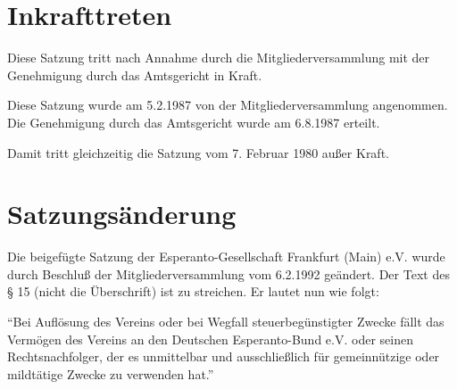 \documentclass[11pt]{article}
\begin{document}
\section{Inkrafttreten}

Diese Satzung tritt nach Annahme durch die Mitgliederversammlung mit der Genehmigung durch das Amtsgericht in Kraft.

Diese Satzung wurde am 5.2.1987 von der Mitgliederversammlung angenommen. Die Genehmigung durch das Amtsgericht wurde am 6.8.1987 erteilt.

Damit tritt gleichzeitig die Satzung vom 7. Februar 1980 außer Kraft.

\section*{Satzungsänderung}

Die beigefügte Satzung der Esperanto-Gesellschaft Frankfurt (Main) e.V. wurde durch Beschluß der Mitgliederversammlung vom 6.2.1992 geändert. Der Text des § 15 (nicht die Überschrift) ist zu streichen. Er lautet nun wie folgt:

"`Bei Auflösung des Vereins oder bei Wegfall steuerbegünstigter Zwecke fällt das Vermögen des Vereins an den Deutschen Esperanto-Bund e.V. oder seinen Rechtsnachfolger, der es unmittelbar und ausschließlich für gemeinnützige oder mildtätige Zwecke zu verwenden hat."'
\end{document}
